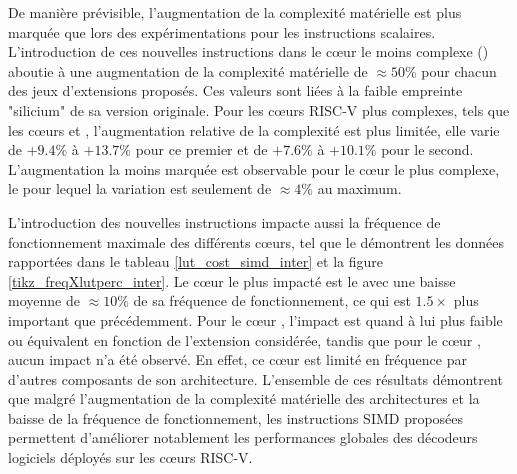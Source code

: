 \documentclass[../main.tex]{subfiles}
\begin{document}
De manière prévisible, l'augmentation de la complexité matérielle est plus marquée que lors des expérimentations pour les instructions scalaires. 
L'introduction de ces nouvelles instructions dans le cœur le moins complexe (\PicoRV) aboutie à une augmentation de la complexité matérielle de $\approx 50\%$ pour chacun des jeux d'extensions proposés. 
Ces valeurs sont liées à la faible empreinte "silicium" de sa version originale. 
Pour les cœurs RISC-V plus complexes, tels que les cœurs \IBEX\space et \SCR, l'augmentation relative de la complexité est plus limitée, elle varie de $+9.4\%$ à $+13.7\%$ pour ce premier et de $+7.6\%$ à $+10.1\%$ pour le second. 
L'augmentation la moins marquée est observable pour le cœur le plus complexe, le \RISCY\space pour lequel la variation est seulement de $\approx 4\%$ au maximum. 

L'introduction des nouvelles instructions impacte aussi la fréquence de fonctionnement maximale des différents cœurs, tel que le démontrent les données rapportées dans le tableau \ref{lut_cost_simd_inter} et la figure \ref{tikz_freqXlutperc_inter}. 
Le cœur le plus impacté est le \PicoRV\space avec une baisse moyenne de $\approx 10\%$ de sa fréquence de fonctionnement, ce qui est $1.5\times$ plus important que précédemment. 
Pour le cœur \IBEX, l'impact est quand à lui plus faible ou équivalent en fonction de l'extension considérée, tandis que pour le cœur \RISCY, aucun impact n'a été observé. 
En effet, ce cœur est limité en fréquence par d'autres composants de son architecture. 
L'ensemble de ces résultats démontrent que malgré l'augmentation de la complexité matérielle des architectures et la baisse de la fréquence de fonctionnement, les instructions SIMD proposées permettent d'améliorer notablement les performances globales des décodeurs logiciels déployés sur les cœurs RISC-V.



%
%
%
%
%
%
%
\end{document}
